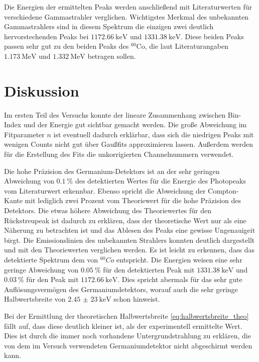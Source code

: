 \noindent Die Energien der ermittelten Peaks werden anschließend mit Literaturwerten für verschiedene Gammastrahler verglichen. Wichtigstes Merkmal des unbekannten Gammastrahlers sind in diesem Spektrum die einzigen zwei deutlich hervorstechenden Peaks bei $\SI{1172,66}{\kilo \electronvolt}$ und $\SI{1331,38}{\kilo \electronvolt}$. Diese beiden Peaks passen sehr gut zu den beiden Peaks des $^{60}$Co, die laut Literaturangaben \cite{Q4} $\SI{1,173}{\mega \electronvolt}$ und $\SI{1,332}{\mega \electronvolt}$ betragen sollen.

\section{Diskussion}
Im ersten Teil des Versuchs konnte der lineare Zusammenhang zwischen Bin-Index
und der Energie gut sichtbar gemacht werden.
Die große Abweichung im Fitparameter $n$ ist eventuell dadurch erklärbar, dass
sich die niedrigen Peaks mit wenigen Counts nicht gut über Gaußfits
approximieren lassen. Außerdem werden für die Erstellung des Fits die
unkorrigierten Channelnummern verwendet.

\noindent Die hohe Präzision des Germanium-Detektors ist an der sehr geringen
Abweichung von $\SI{0,1}{\percent}$ des detektierten Wertes für die Energie des
Photopeaks vom Literaturwert \cite{Q3} erkennbar. Ebenso spricht die Abweichung
der Compton-Kante mit lediglich zwei Prozent vom Theoriewert für die hohe
Präzision des Detektors. Die etwas höhere Abweichung des Theoriewertes für den
Rückstreupeak ist dadurch zu erklären, dass der theoretische Wert nur als eine
Näherung zu betrachten ist und das Ablesen des Peaks eine gewisse Ungenauigeit
birgt.
Die Emissionslinien des unbekannten Strahlers konnten deutlich dargestellt und
mit den Theoriewerten verglichen werden. Es ist leicht zu erkennen, dass das
detektierte Spektrum dem von $^{60}Co$ entspricht. Die Energien weisen eine
sehr geringe Abweichung von $\SI{0,05}{\percent}$ für den detektierten Peak mit
$\SI{1331,38}{\kilo \electronvolt}$ und $\SI{0,03}{\percent}$ für den Peak mit
$\SI{1172,66}{\kilo \electronvolt}$. Dies spricht abermals für das sehr gute
Auflösungsvermögen des Germaniumdetektors, worauf auch die sehr geringe Halbwertsbreite von $\SI{2,45(23)}{\kilo \electronvolt}$ schon hinweist.

\noindent Bei der Ermittlung der theoretischen Halbwertsbreite
\ref{eq:halbwertsbreite_theo} fällt auf, dass diese deutlich kleiner ist, als
der experimentell ermittelte Wert. Dies ist durch die immer noch vorhandene
Untergrundstrahlung zu erklären, die von dem im Versuch verwendeten
Germaniumdetektor nicht abgeschirmt werden kann.


\printbibliography
